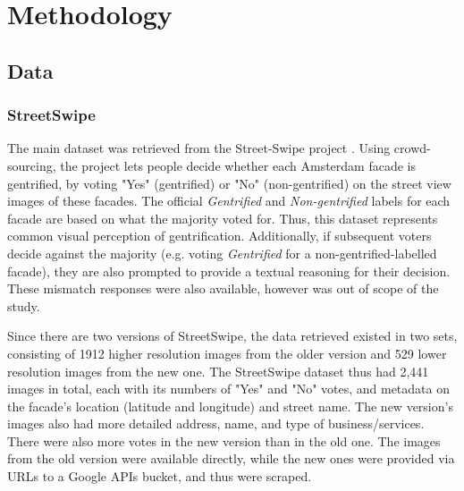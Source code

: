 \section{Methodology}
\label{sec:methodology}

\subsection{Data}
\subsubsection{StreetSwipe}
The main dataset was retrieved from the Street-Swipe project \cite{streetswipe}. Using crowd-sourcing, the project lets people decide whether each Amsterdam facade is gentrified, by voting "Yes" (gentrified) or "No" (non-gentrified) on the street view images of these facades. The official \textit{Gentrified} and \textit{Non-gentrified} labels for each facade are based on what the majority voted for. Thus, this dataset represents common visual perception of gentrification. Additionally, if subsequent voters decide against the majority (e.g. voting \textit{Gentrified} for a non-gentrified-labelled facade), they are also prompted to provide a textual reasoning for their decision. These mismatch responses were also available, however was out of scope of the study. 

Since there are two versions of StreetSwipe, the data retrieved existed in two sets, consisting of 1912 higher resolution images from the older version and 529 lower resolution images from the new one. The StreetSwipe dataset thus had 2,441 images in total, each with its numbers of "Yes" and "No" votes, and metadata on the facade's location (latitude and longitude) and street name. The new version's images also had more detailed address, name, and type of business/services. There were also more votes in the new version than in the old one. The images from the old version were available directly, while the new ones were provided via URLs to a Google APIs bucket, and thus were scraped.

